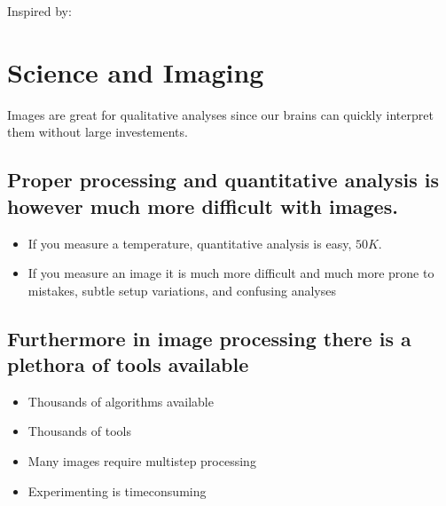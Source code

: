 \documentclass[letterpaper,10pt,english]{sphinxmanual}
\begin{document}
\sphinxAtStartPar
Inspired by: 


\section{Science and Imaging}
\label{\detokenize{01-Introduction:science-and-imaging}}
\sphinxAtStartPar
Images are great for qualitative analyses since our brains can quickly interpret them without large  investements.


\subsection{Proper processing and quantitative analysis is however much more difficult with images.}
\label{\detokenize{01-Introduction:proper-processing-and-quantitative-analysis-is-however-much-more-difficult-with-images}}\begin{itemize}
\item {} 
\sphinxAtStartPar
If you measure a temperature, quantitative analysis is easy, \(50K\).

\item {} 
\sphinxAtStartPar
If you measure an image it is much more difficult and much more prone to mistakes, subtle setup variations, and confusing analyses

\end{itemize}


\subsection{Furthermore in image processing there is a plethora of tools available}
\label{\detokenize{01-Introduction:furthermore-in-image-processing-there-is-a-plethora-of-tools-available}}\begin{itemize}
\item {} 
\sphinxAtStartPar
Thousands of algorithms available

\item {} 
\sphinxAtStartPar
Thousands of tools

\item {} 
\sphinxAtStartPar
Many images require multi\sphinxhyphen{}step processing

\item {} 
\sphinxAtStartPar
Experimenting is time\sphinxhyphen{}consuming

\end{itemize}
\end{document}
